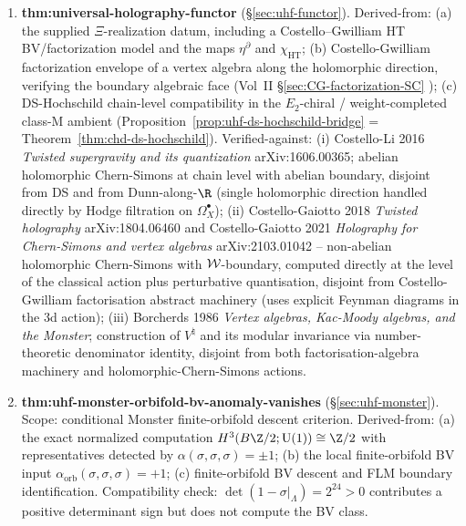 \begin{enumerate}
\item \textbf{thm:universal-holography-functor}
 \textup{(}\S\ref{sec:uhf-functor}\textup{)}.
 Derived-from: \textup{(a)} the supplied
 \(\Xi\)-realization datum, including a Costello--Gwilliam HT
 BV/factorization model and the maps \(\eta^\partial\) and
 \(\chi_{\mathrm{HT}}\); \textup{(b)} Costello-Gwilliam
 factorization envelope of a vertex algebra along the holomorphic
 direction, verifying the boundary algebraic face
 \textup{(}Vol~II \S\ref*{sec:CG-factorization-SC}%
 \textup{)}; \textup{(c)} DS-Hochschild chain-level compatibility in
 the $E_2$-chiral / weight-completed class-M ambient
 \textup{(}Proposition~\ref{prop:uhf-ds-hochschild-bridge} =
 Theorem~\ref*{thm:chd-ds-hochschild}\textup{)}.
 Verified-against: \textup{(i)} Costello-Li 2016 \emph{Twisted
 supergravity and its quantization} arXiv:1606.00365; abelian
 holomorphic Chern-Simons at chain level with abelian boundary,
 disjoint from DS and from Dunn-along-$\R$ \textup{(}single
 holomorphic direction handled directly by Hodge filtration on
 $\Omega^\bullet_X$\textup{)};
 \textup{(ii)} Costello-Gaiotto 2018 \emph{Twisted holography}
 arXiv:1804.06460 and Costello-Gaiotto 2021 \emph{Holography for
 Chern-Simons and vertex algebras} arXiv:2103.01042 --
 non-abelian holomorphic Chern-Simons with $\mathcal{W}$-boundary,
 computed directly at the level of the classical action plus
 perturbative quantisation, disjoint from Costello-Gwilliam
 factorisation abstract machinery \textup{(}uses explicit
 Feynman diagrams in the 3d action\textup{)};
 \textup{(iii)} Borcherds 1986 \emph{Vertex algebras, Kac-Moody
 algebras, and the Monster}; construction of $V^\natural$ and
 its modular invariance via number-theoretic denominator
 identity, disjoint from both factorisation-algebra machinery
 and holomorphic-Chern-Simons actions.

\item \textbf{thm:uhf-monster-orbifold-bv-anomaly-vanishes}
 \textup{(}\S\ref{sec:uhf-monster}\textup{)}.
 Scope: conditional Monster finite-orbifold descent criterion.
 Derived-from: \textup{(a)} the exact normalized computation
 $H^3(B\Z/2;\mathrm{U}(1))\cong\Z/2$ with representatives detected
 by $\alpha(\sigma,\sigma,\sigma)=\pm1$; \textup{(b)} the local
 finite-orbifold BV input
 $\alpha_{\mathrm{orb}}(\sigma,\sigma,\sigma)=+1$; \textup{(c)}
 finite-orbifold BV descent and FLM boundary identification.
 Compatibility check: $\det(1-\sigma|_\Lambda)=2^{24}>0$ contributes
 a positive determinant sign but does not compute the BV class.


\end{enumerate}
